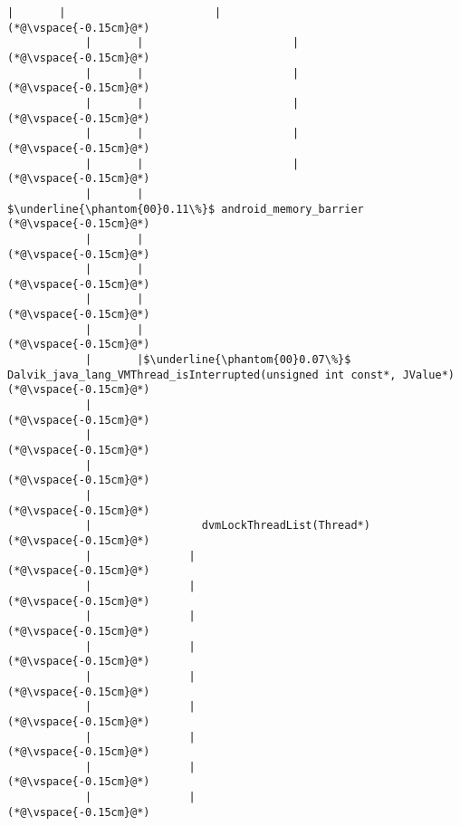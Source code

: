\begin{lstlisting}[caption=Staattinen metodi Java$\to$C , label=profile:J2CBenchmark00001, numberbychapter=true, frame=lines, float, floatplacement=t]
            |       |                       |
(*@\vspace{-0.15cm}@*)
            |       |                       |
(*@\vspace{-0.15cm}@*)
            |       |                       |
(*@\vspace{-0.15cm}@*)
            |       |                       |
(*@\vspace{-0.15cm}@*)
            |       |                       |
(*@\vspace{-0.15cm}@*)
            |       |                       |
(*@\vspace{-0.15cm}@*)
            |       |                        $\underline{\phantom{00}0.11\%}$ android_memory_barrier
(*@\vspace{-0.15cm}@*)
            |       |        
(*@\vspace{-0.15cm}@*)
            |       |        
(*@\vspace{-0.15cm}@*)
            |       |
(*@\vspace{-0.15cm}@*)
            |       |
(*@\vspace{-0.15cm}@*)
            |       |$\underline{\phantom{00}0.07\%}$ Dalvik_java_lang_VMThread_isInterrupted(unsigned int const*, JValue*)
(*@\vspace{-0.15cm}@*)
            |        
(*@\vspace{-0.15cm}@*)
            |        
(*@\vspace{-0.15cm}@*)
            |        
(*@\vspace{-0.15cm}@*)
            |        
(*@\vspace{-0.15cm}@*)
            |                 dvmLockThreadList(Thread*)
(*@\vspace{-0.15cm}@*)
            |               |
(*@\vspace{-0.15cm}@*)
            |               |
(*@\vspace{-0.15cm}@*)
            |               |
(*@\vspace{-0.15cm}@*)
            |               |
(*@\vspace{-0.15cm}@*)
            |               |
(*@\vspace{-0.15cm}@*)
            |               |
(*@\vspace{-0.15cm}@*)
            |               |
(*@\vspace{-0.15cm}@*)
            |               |
(*@\vspace{-0.15cm}@*)
            |               |
(*@\vspace{-0.15cm}@*)

\end{lstlisting}
